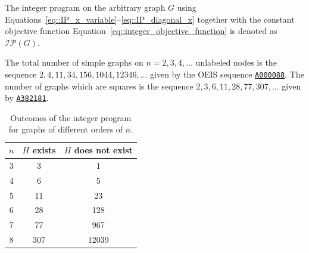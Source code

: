 \documentclass[10pt]{beamer}
\begin{document}
\begin{frame}
    The integer program on the arbitrary graph $G$ using Equations~\eqref{eq::IP_x_variable}--\eqref{eq::IP_diagonal_x} together with the constant objective function Equation~\eqref{eq::integer_objective_function} is denoted as $\mathcal{IP}(G)$. 

    The total number of simple graphs on $n=2,3,4,\dots$ unlabeled nodes is the sequence $2,4,11,34,156,1044,12346,\dots$ given by the OEIS sequence \href{https://oeis.org/A000088}{\texttt{A000088}}. The number of graphs which are squares is the sequence $2,3,6,11,28,77,307,\dots$ given by \href{https://oeis.org/A382181}{\texttt{A382181}}.

    \begin{table}[!htbp]
        \centering
        \begin{tabular}{c|cc}
        \hline
        $n$ 
        & $H$ exists
        & $H$ does not exist \\
        \hline
        3 & 3   & 1    \\
        4 & 6   & 5    \\
        5 & 11  & 23   \\
        6 & 28  & 128  \\
        7 & 77  & 967  \\
        8 & 307 & 12039 \\
        \hline
        \end{tabular}
        \caption{Outcomes of the integer program for graphs of different orders of $n$.}
        \label{tab::integer_program_outcomes}
    \end{table}
\end{frame}
\end{document}

